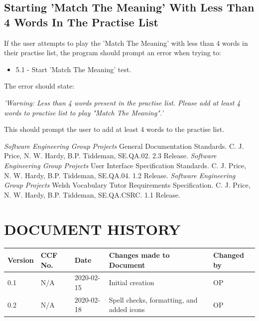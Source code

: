 \documentclass{project}
\begin{document}
\subsection{Starting 'Match The Meaning' With Less Than 4 Words In The Practise List}
If the user attempts to play the 'Match The Meaning' with less than 4 words in their practise list, the program should prompt an error when trying to:
\begin{itemize}
	\item 5.1 - Start 'Match The Meaning' test.
	\end{itemize}
The error should state:
\begin{center}
	\emph{'Warning: Less than 4 words present in the practise list. Please add at least 4 words to practise list to play "Match The Meaning".'}
\end{center}
This should prompt the user to add at least 4 words to the practise list.
\begin{thebibliography}{5}
 \emph{Software Engineering Group Projects}
General Documentation Standards.
C. J. Price, N. W. Hardy, B.P. Tiddeman, SE.QA.02. 2.3 Release.
 \emph{Software Engineering Group Projects}
User Interface Specification Standards.
C. J. Price, N. W. Hardy, B.P. Tiddeman, SE.QA.04. 1.2 Release.
 \emph{Software Engineering Group Projects}
Welsh Vocabulary Tutor Requirements Specification.
C. J. Price, N. W. Hardy, B.P. Tiddeman, SE.QA.CSRC. 1.1 Release.
\end{thebibliography}
\section*{DOCUMENT HISTORY}
\begin{tabular}{|l | l | l | l | l |}
\hline
Version & CCF No. & Date & Changes made to Document & Changed by \\
\hline
0.1 & N/A & 2020-02-15 & Initial creation & OP \\
\hline
0.2 & N/A & 2020-02-18 & Spell checks, formatting, and added icons & OP \\
\hline
\end{tabular}
\label{thelastpage}
\end{document}
